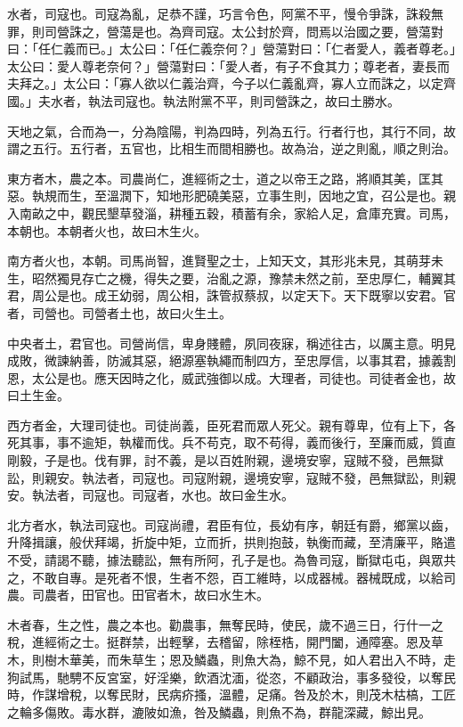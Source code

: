水者，司寇也。司寇為亂，足恭不謹，巧言令色，阿黨不平，慢令爭誅，誅殺無罪，則司營誅之，營蕩是也。為齊司寇。太公封於齊，問焉以治國之要，營蕩對曰：「任仁義而已。」太公曰：「任仁義奈何？」營蕩對曰：「仁者愛人，義者尊老。」太公曰：愛人尊老奈何？」營蕩對曰：「愛人者，有子不食其力；尊老者，妻長而夫拜之。」太公曰：「寡人欲以仁義治齊，今子以仁義亂齊，寡人立而誅之，以定齊國。」夫水者，執法司寇也。執法附黨不平，則司營誅之，故曰土勝水。



天地之氣，合而為一，分為陰陽，判為四時，列為五行。行者行也，其行不同，故謂之五行。五行者，五官也，比相生而間相勝也。故為治，逆之則亂，順之則治。


東方者木，農之本。司農尚仁，進經術之士，道之以帝王之路，將順其美，匡其惡。執規而生，至溫潤下，知地形肥磽美惡，立事生則，因地之宜，召公是也。親入南畝之中，觀民墾草發淄，耕種五穀，積蓄有余，家給人足，倉庫充實。司馬，本朝也。本朝者火也，故曰木生火。


南方者火也，本朝。司馬尚智，進賢聖之士，上知天文，其形兆未見，其萌芽未生，昭然獨見存亡之機，得失之要，治亂之源，豫禁未然之前，至忠厚仁，輔翼其君，周公是也。成王幼弱，周公相，誅管叔蔡叔，以定天下。天下既寧以安君。官者，司營也。司營者土也，故曰火生土。


中央者土，君官也。司營尚信，卑身賤體，夙同夜寐，稱述往古，以厲主意。明見成敗，微諫納善，防滅其惡，絕源塞執繩而制四方，至忠厚信，以事其君，據義割恩，太公是也。應天因時之化，威武強御以成。大理者，司徒也。司徒者金也，故曰土生金。


西方者金，大理司徒也。司徒尚義，臣死君而眾人死父。親有尊卑，位有上下，各死其事，事不逾矩，執權而伐。兵不苟克，取不苟得，義而後行，至廉而威，質直剛毅，子是也。伐有罪，討不義，是以百姓附親，邊境安寧，寇賊不發，邑無獄訟，則親安。執法者，司寇也。司寇附親，邊境安寧，寇賊不發，邑無獄訟，則親安。執法者，司寇也。司寇者，水也。故曰金生水。


北方者水，執法司寇也。司寇尚禮，君臣有位，長幼有序，朝廷有爵，鄉黨以齒，升降揖讓，般伏拜竭，折旋中矩，立而折，拱則抱鼓，執衡而藏，至清廉平，賂遣不受，請謁不聽，據法聽訟，無有所阿，孔子是也。為魯司寇，斷獄屯屯，與眾共之，不敢自專。是死者不恨，生者不怨，百工維時，以成器械。器械既成，以給司農。司農者，田官也。田官者木，故曰水生木。




木者春，生之性，農之本也。勸農事，無奪民時，使民，歲不過三日，行什一之稅，進經術之士。挺群禁，出輕擊，去稽留，除桎梏，開門闔，通障塞。恩及草木，則樹木華美，而朱草生；恩及鱗蟲，則魚大為，鯨不見，如人君出入不時，走狗試馬，馳騁不反宮室，好淫樂，飲酒沈湎，從恣，不顧政治，事多發役，以奪民時，作謀增稅，以奪民財，民病疥搔，溫體，足痛。咎及於木，則茂木枯槁，工匠之輪多傷敗。毒水群，漉陂如漁，咎及鱗蟲，則魚不為，群龍深藏，鯨出見。


